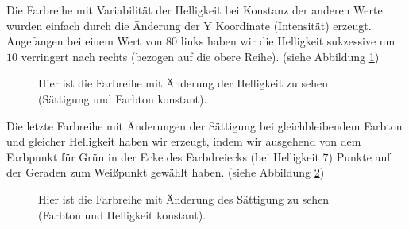 \documentclass[11pt]{article}
\begin{document}
Die Farbreihe mit Variabilität der Helligkeit bei Konstanz der anderen Werte wurden einfach durch die Änderung der Y Koordinate (Intensität) erzeugt. Angefangen bei einem Wert von $80$ links haben wir die Helligkeit sukzessive um $10$ verringert nach rechts (bezogen auf die obere Reihe).  (siehe Abbildung \ref{helligkeit_reihe})
\begin{figure}[H]
\caption{Hier ist die Farbreihe mit Änderung der Helligkeit zu sehen (Sättigung und Farbton konstant).}
\label{helligkeit_reihe}
\end{figure}

Die letzte Farbreihe mit Änderungen der Sättigung bei gleichbleibendem Farbton und gleicher Helligkeit haben wir erzeugt, indem wir ausgehend von dem Farbpunkt für Grün in der Ecke des Farbdreiecks (bei Helligkeit $7$) Punkte auf der Geraden zum Weißpunkt gewählt haben. (siehe Abbildung \ref{saettigung_reihe})
\begin{figure}[H]
\caption{Hier ist die Farbreihe mit Änderung des Sättigung zu sehen (Farbton und Helligkeit konstant).}
\label{saettigung_reihe}
\end{figure}
\end{document}
